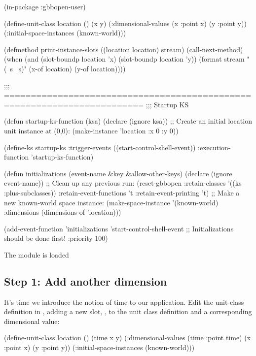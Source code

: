\documentclass[10pt,twoside,english,pdftex]{article}
\begin{document}
\begin{example}
  (in-package :gbbopen-user)

  (define-unit-class location ()
    (x y)
    (:dimensional-values
      (x :point x)
      (y :point y))
    (:initial-space-instances (known-world)))

  (defmethod print-instance-slots ((location location) stream)
    (call-next-method)
    (when (and (slot-boundp location 'x)
               (slot-boundp location 'y))
      (format stream " (~s ~s)"
              (x-of location)
              (y-of location))))

  ;;; ========================================================================
  ;;;   Startup KS

  (defun startup-ks-function (ksa)
    (declare (ignore ksa))
    ;; Create an initial location unit instance at (0,0):
    (make-instance 'location :x 0 :y 0))

  (define-ks startup-ks
      :trigger-events ((start-control-shell-event))
      :execution-function 'startup-ks-function)

  (defun initializations (event-name &key &allow-other-keys)
    (declare (ignore event-name))
    ;; Clean up any previous run:
    (reset-gbbopen :retain-classes '((ks :plus-subclasses))
                   :retain-event-functions 't
                   :retain-event-printing 't)
    ;; Make a new known-world space instance:
    (make-space-instance 
     '(known-world)
     :dimensions (dimensions-of 'location)))

  (add-event-function 'initializations 'start-control-shell-event
                      ;; Initializations should be done first!
                      :priority 100)
\end{example}

\begin{tightitemize}
\item The  module is loaded
\end{tightitemize}

\subsection*{Step 1: Add  another dimension}

It's time we introduce the notion of time to our application.  Edit the
 unit-class definition in , adding
a new slot, , to the  unit class definition and a
corresponding  dimensional value:
%
\begin{example}\color{darkergray}%
  (define-unit-class location ()
    (\textcolor{black}{time} 
     x y)
    (:dimensional-values
      \textcolor{black}{(time :point time)}
      (x :point x)
      (y :point y))
    (:initial-space-instances (known-world)))
\end{example}
\end{document}
